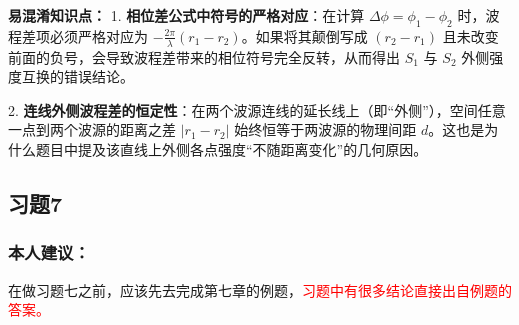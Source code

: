\textbf{易混淆知识点： }
1. \textbf{相位差公式中符号的严格对应}：在计算 $\Delta \phi = \phi_1 - \phi_2$ 时，波程差项必须严格对应为 $- \frac{2\pi}{\lambda}(r_1 - r_2)$。如果将其颠倒写成 $(r_2 - r_1)$ 且未改变前面的负号，会导致波程差带来的相位符号完全反转，从而得出 $S_1$ 与 $S_2$ 外侧强度互换的错误结论。

2. \textbf{连线外侧波程差的恒定性}：在两个波源连线的延长线上（即“外侧”），空间任意一点到两个波源的距离之差 $|r_1 - r_2|$ 始终恒等于两波源的物理间距 $d$。这也是为什么题目中提及该直线上外侧各点强度“不随距离变化”的几何原因。

\newpage

\subsection{习题7}

\subsubsection*{本人建议：}
在做习题七之前，应该先去完成第七章的例题，\textcolor{red}{习题中有很多结论直接出自例题的答案。}

